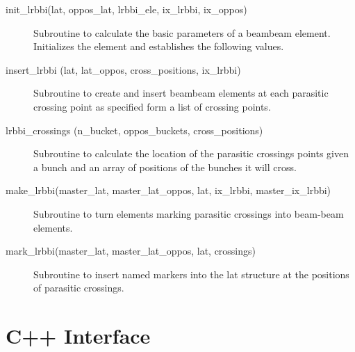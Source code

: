\begin{description}

\item[init_lrbbi(lat, oppos_lat, lrbbi_ele, ix_lrbbi, ix_oppos)] \Newline 
     Subroutine to calculate the basic parameters of a beambeam element. 
     Initializes the element and establishes the following values.

\item[insert_lrbbi (lat, lat_oppos, cross_positions, ix_lrbbi)] \Newline
Subroutine to create and insert beambeam elements at each parasitic crossing
point as specified form a list of crossing points.

\item[lrbbi_crossings (n_bucket, oppos_buckets, cross_positions)] \Newline
Subroutine to calculate the location of the parasitic crossings points 
given a bunch and an array of positions of the bunches it will cross. 

\item[make_lrbbi(master_lat, master_lat_oppos, lat, ix_lrbbi, master_ix_lrbbi)] \Newline
Subroutine to turn elements marking parasitic crossings into beam-beam elements. 

\item[mark_lrbbi(master_lat, master_lat_oppos, lat, crossings)] \Newline
Subroutine to insert named markers into the lat structure at the positions of parasitic crossings. 

\end{description}

\section{C++ Interface}
\label{r:cpp}      

